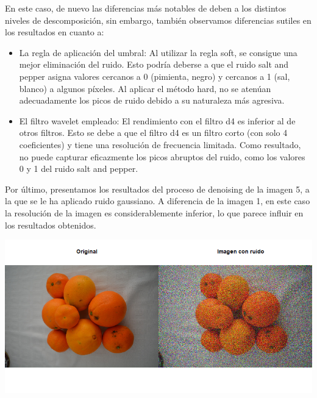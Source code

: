 \documentclass[
]{article}
\begin{document}
En este caso, de nuevo las diferencias más notables de deben a los
distintos niveles de descomposición, sin embargo, también observamos
diferencias sutiles en los resultados en cuanto a:

\begin{itemize}
\item
  La regla de aplicación del umbral: Al utilizar la regla soft, se
  consigue una mejor eliminación del ruido. Esto podría deberse a que el
  ruido salt and pepper asigna valores cercanos a 0 (pimienta, negro) y
  cercanos a 1 (sal, blanco) a algunos píxeles. Al aplicar el método
  hard, no se atenúan adecuadamente los picos de ruido debido a su
  naturaleza más agresiva.
\item
  El filtro wavelet empleado: El rendimiento con el filtro d4 es
  inferior al de otros filtros. Esto se debe a que el filtro d4 es un
  filtro corto (con solo 4 coeficientes) y tiene una resolución de
  frecuencia limitada. Como resultado, no puede capturar eficazmente los
  picos abruptos del ruido, como los valores 0 y 1 del ruido salt and
  pepper.
\end{itemize}

Por último, presentamos los resultados del proceso de denoising de la
imagen 5, a la que se le ha aplicado ruido gaussiano. A diferencia de la
imagen 1, en este caso la resolución de la imagen es considerablemente
inferior, lo que parece influir en los resultados obtenidos.

\begin{center}\includegraphics[width=0.4\linewidth,height=0.4\textheight]{denoisedwt2d/image5_noise} \end{center}
\end{document}
